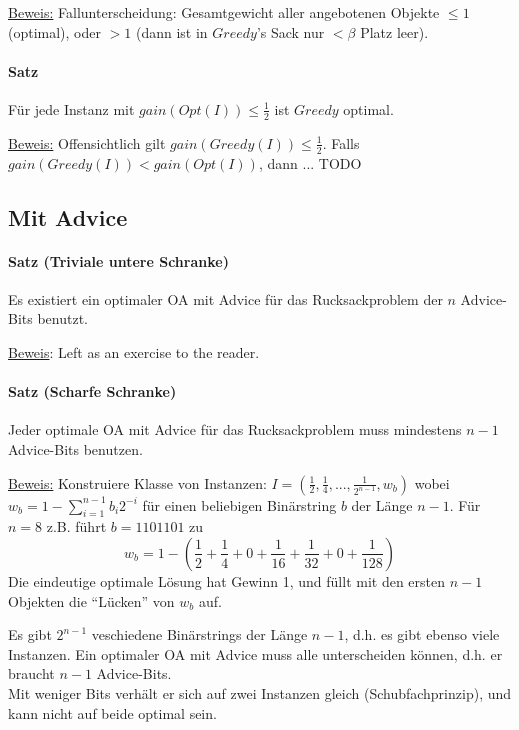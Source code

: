 \underline{Beweis:}
Fallunterscheidung: Gesamtgewicht aller angebotenen Objekte $\leq 1$ (optimal), oder $> 1$ (dann
ist in $Greedy$'s Sack nur $< \beta$ Platz leer).

\paragraph{Satz}
Für jede Instanz mit $gain(Opt(I)) \leq \frac{1}{2}$ ist $Greedy$ optimal.

\underline{Beweis:}
Offensichtlich gilt $gain(Greedy(I)) \leq \frac{1}{2}$.
Falls $gain(Greedy(I)) < gain(Opt(I))$, dann ...
TODO


\subsection{Mit Advice}

\paragraph{Satz (Triviale untere Schranke)}
Es existiert ein optimaler OA mit Advice für das Rucksackproblem der $n$ Advice-Bits benutzt.

\underline{Beweis}: Left as an exercise to the reader.

\paragraph{Satz (Scharfe Schranke)}
Jeder optimale OA mit Advice für das Rucksackproblem muss mindestens $n-1$ Advice-Bits benutzen.

\underline{Beweis:}
Konstruiere Klasse von Instanzen:
$ I = (\frac{1}{2}, \frac{1}{4}, ... , \frac{1}{2^{n-1}}, w_b)$
wobei $ w_b = 1 - \sum_{i=1}^{n-1} b_i 2^{-i} $ für einen beliebigen Binärstring $b$ der Länge $n-1$.
Für $n=8$ z.B. führt $b=1101101$ zu
$$ w_b = 1 - \left( \frac{1}{2} + \frac{1}{4} + 0 + \frac{1}{16} + \frac{1}{32} + 0 + \frac{1}{128} \right) $$
Die eindeutige optimale Lösung hat Gewinn 1, und füllt mit den ersten $n-1$ Objekten die ``Lücken''
von $w_b$ auf.

Es gibt $2^{n-1}$ veschiedene Binärstrings der Länge $n-1$, d.h. es gibt ebenso viele Instanzen.
Ein optimaler OA mit Advice muss alle unterscheiden können, d.h. er braucht $n-1$ Advice-Bits.
\\
Mit weniger Bits verhält er sich auf zwei Instanzen gleich (Schubfachprinzip),
und kann nicht auf beide optimal sein.

